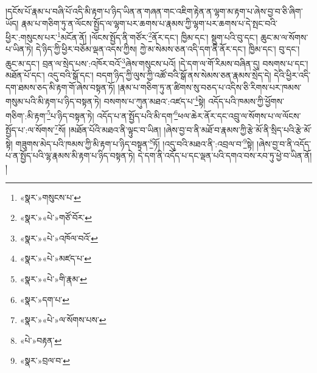 །དངོས་པོ་རྣམ་པ་བཞི་པོ་འདི་མི་རྟག་པ་ཉིད་ཡིན་ན་གཞན་གང་འཇིག་རྟེན་ན་ལྷག་མ་རྟག་པ་ཞེས་བྱ་བ་ཅི་ཞིག་ཡོད། རྣམ་པ་གཅིག་ཏུ་ན་ལོངས་སྤྱོད་ལ་ལྷག་པར་ཆགས་པ་རྣམས་ཀྱི་ལྷག་པར་ཆགས་པ་དེ་སྤང་བའི་ཕྱིར་:གསུངས་པར་\footnote{«སྣར་»གསུངས་པ་}མངོན་ནོ། །ལོངས་སྤྱོད་ནི་གཙོར་\footnote{«སྣར་»«པེ་»གཙོ་བོར་}ནོར་དང་། ཁྱིམ་དང་། སྡུག་པའི་བུ་དང་། ཆུང་མ་ལ་སོགས་པ་ཡིན་ཏེ། དེ་ཉིད་ཀྱི་ཕྱིར་བཅོམ་ལྡན་འདས་ཀྱིས། ཀྱེ་མ་སེམས་ཅན་འདི་དག་ནི་ནོར་དང་། ཁྱིམ་དང་། བུ་དང་། ཆུང་མ་དང་། བྲན་ལ་སྲེད་པས་:འཁོར་བའོ་\footnote{«སྣར་»«པེ་»འཁོལ་བའོ་}ཞེས་གསུངས་པའོ། །དེ་དག་ལ་གོ་རིམས་བཞིན་དུ། བསགས་པ་དང་། མཐོན་པོ་དང་། འདུ་བའི་སྒོ་དང་། བདག་ཉིད་ཀྱི་ལུས་ཀྱི་འཚོ་བའི་སྒོ་ནས་སེམས་ཅན་རྣམས་སྲེད་དེ། དེའི་ཕྱིར་འདི་དག་ཐམས་ཅད་མི་རྟག་གོ་ཞེས་བསྟན་ཏོ། །རྣམ་པ་གཅིག་ཏུ་ན་ཚིགས་སུ་བཅད་པ་འདིས་ཅི་རིགས་པར་ཁམས་གསུམ་པའི་མི་རྟག་པ་ཉིད་བསྟན་ཏེ། བསགས་པ་ཀུན་མཐའ་:འཛད་པ་\footnote{«སྣར་»«པེ་»མཛད་པ་}སྟེ། འདོད་པའི་ཁམས་ཀྱི་ཕྱོགས་གཅིག་:མི་རྟག་\footnote{«སྣར་»«པེ་»གི་རྣམ་}པ་ཉིད་བསྟན་ཏེ། འདོད་པ་ན་སྤྱོད་པའི་མི་དག་\footnote{«སྣར་»དག་པ་}ཕལ་ཆེར་ནོར་དང་འབྲུ་ལ་སོགས་པ་ལ་ལོངས་སྤྱོད་པ་:ལ་སོགས་\footnote{«སྣར་»«པེ་»ལ་སོགས་པས་}སོ། །མཐོན་པོའི་མཐའ་ནི་ལྟུང་བ་ཡིན། །ཞེས་བྱ་བ་ནི་མཐོ་བ་རྣམས་ཀྱི་རྩེ་མོ་ནི་སྲིད་པའི་རྩེ་མོ་སྟེ། གཟུགས་མེད་པའི་ཁམས་ཀྱི་མི་རྟག་པ་ཉིད་བསྟན་\footnote{«པེ་»བརྟན་}ཏོ། །འདུ་བའི་མཐའ་ནི་:འབྲལ་བ་\footnote{«སྣར་»བྲལ་བ་}སྟེ། །ཞེས་བྱ་བ་ནི་འདོད་པ་ན་སྤྱོད་པའི་ལྷ་རྣམས་མི་རྟག་པ་ཉིད་བསྟན་ཏེ། དེ་དག་ནི་འདོད་པ་དང་ལྡན་པའི་དགའ་བས་རབ་ཏུ་ཕྱེ་བ་ཡིན་ནོ། །
